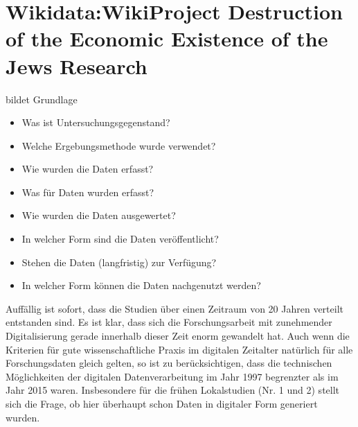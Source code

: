 \onehalfspacing

\section{Wikidata:WikiProject Destruction of the Economic Existence of the Jews Research}
bildet Grundlage

\begin{itemize}
    \item Was ist Untersuchungsgegenstand?
    \item Welche Ergebungsmethode wurde verwendet?
    \item Wie wurden die Daten erfasst?
    \item Was für Daten wurden erfasst?
    \item Wie wurden die Daten ausgewertet?
    \item In welcher Form sind die Daten veröffentlicht?
    \item Stehen die Daten (langfristig) zur Verfügung?
    \item In welcher Form können die Daten nachgenutzt werden?
    \end{itemize}
    
    Auffällig ist sofort, dass die Studien über einen Zeitraum von 20 Jahren verteilt entstanden sind. Es ist klar, dass sich die Forschungsarbeit mit zunehmender Digitalisierung gerade innerhalb dieser Zeit enorm gewandelt hat. Auch wenn die Kriterien für gute wissenschaftliche Praxis im digitalen Zeitalter natürlich für alle Forschungsdaten gleich gelten, so ist zu berücksichtigen, dass die technischen Möglichkeiten der digitalen Datenverarbeitung im Jahr 1997 begrenzter als im Jahr 2015 waren. Insbesondere für die frühen Lokalstudien (Nr. 1 und 2) stellt sich die Frage, ob hier überhaupt schon Daten in digitaler Form generiert wurden.  
    
